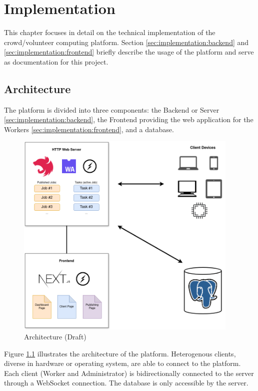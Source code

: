 \chapter{Implementation}
\label{ch:implementation}
This chapter focuses in detail on the technical implementation of the crowd/volunteer computing platform. Section \ref{sec:implementation:backend} and \ref{sec:implementation:frontend} briefly describe the usage of the platform and serve as documentation for this project.

\section{Architecture}
\label{sec:implementation:architecture}
The platform is divided into three components: the Backend or Server \ref{sec:implementation:backend}, the Frontend providing the web application for the Workers \ref{sec:implementation:frontend}, and a database.

\begin{figure}[htbp]
    \centering
    \includegraphics[width=0.95\textwidth]{gfx/figures/WebAssembly-MA.drawio.png}
    \caption{Architecture (Draft)}
    \label{fig:implementation:architecture}
\end{figure}

Figure \ref{fig:implementation:architecture} illustrates the architecture of the platform. Heterogenous clients, diverse in hardware or operating system, are able to connect to the platform. Each client (Worker and Administrator) is bidirectionally connected to the server through a WebSocket connection. The database is only accessible by the server.

